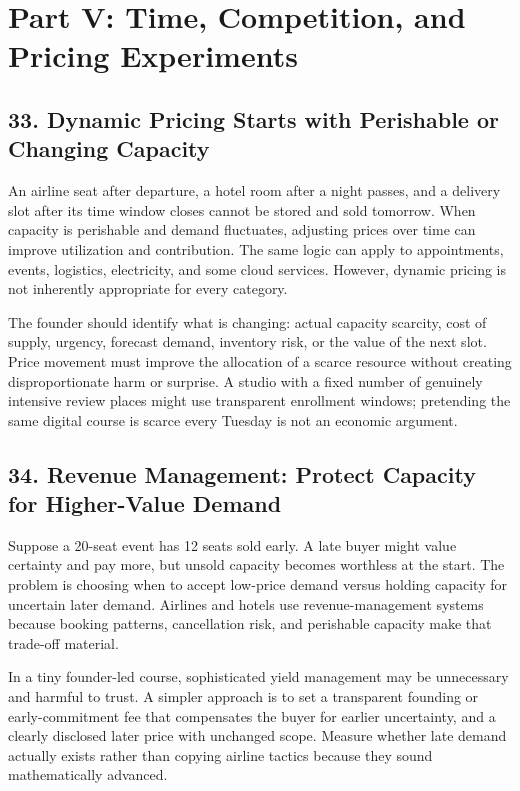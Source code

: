 \section*{Part V: Time, Competition, and Pricing Experiments}

\subsection*{33. Dynamic Pricing Starts with Perishable or Changing Capacity}

An airline seat after departure, a hotel room after a night passes, and a delivery slot after its time window closes cannot be stored and sold tomorrow. When capacity is perishable and demand fluctuates, adjusting prices over time can improve utilization and contribution. The same logic can apply to appointments, events, logistics, electricity, and some cloud services. However, dynamic pricing is not inherently appropriate for every category.

The founder should identify what is changing: actual capacity scarcity, cost of supply, urgency, forecast demand, inventory risk, or the value of the next slot. Price movement must improve the allocation of a scarce resource without creating disproportionate harm or surprise. A studio with a fixed number of genuinely intensive review places might use transparent enrollment windows; pretending the same digital course is scarce every Tuesday is not an economic argument.

\subsection*{34. Revenue Management: Protect Capacity for Higher-Value Demand}

Suppose a 20-seat event has 12 seats sold early. A late buyer might value certainty and pay more, but unsold capacity becomes worthless at the start. The problem is choosing when to accept low-price demand versus holding capacity for uncertain later demand. Airlines and hotels use revenue-management systems because booking patterns, cancellation risk, and perishable capacity make that trade-off material.

In a tiny founder-led course, sophisticated yield management may be unnecessary and harmful to trust. A simpler approach is to set a transparent founding or early-commitment fee that compensates the buyer for earlier uncertainty, and a clearly disclosed later price with unchanged scope. Measure whether late demand actually exists rather than copying airline tactics because they sound mathematically advanced.

